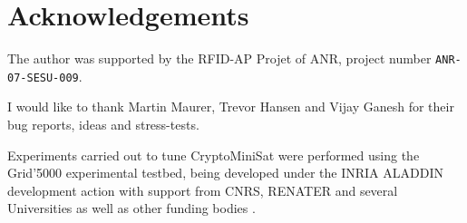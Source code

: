 \documentclass[final]{ieee}
\begin{document}
\section*{Acknowledgements}
The author was supported by the RFID-AP Projet of ANR, project number \texttt{ANR-07-SESU-009}.

I would like to thank Martin Maurer, Trevor Hansen and Vijay Ganesh for their bug reports, ideas and stress-tests.

Experiments carried out to tune CryptoMiniSat were performed using the Grid'5000
experimental testbed, being developed under the INRIA ALADDIN development 
action with support from CNRS, RENATER and several Universities as well 
as other funding bodies \cite{Grid5000}.





\vfill
\pagebreak
\end{document}
